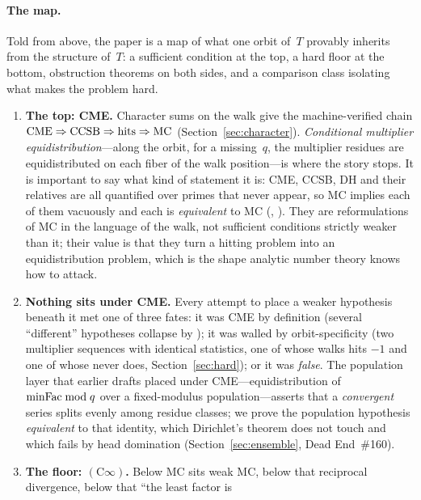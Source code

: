 \paragraph{The map.}
Told from above, the paper is a map of what one orbit of~$T$ provably
inherits from the structure of~$T$: a sufficient condition at the top,
a hard floor at the bottom, obstruction theorems on both sides, and a
comparison class isolating what makes the problem hard.
\begin{enumerate}[nosep,leftmargin=*]
\item \textbf{The top: CME.}  Character sums on the walk give the
  machine-verified chain
  $\mathrm{CME} \Rightarrow \mathrm{CCSB} \Rightarrow \text{hits} \Rightarrow \mathrm{MC}$
  (Section~\ref{sec:character}).  \emph{Conditional multiplier
  equidistribution}---along the orbit, for a missing~$q$, the multiplier
  residues are equidistributed on each fiber of the walk position---is
  where the story stops.  It is important to say what kind of statement
  it is: CME, CCSB, DH and their relatives are all quantified over primes
  that never appear, so MC implies each of them vacuously and each is
  \emph{equivalent} to MC (,
  ).  They are
  reformulations of MC in the language of the walk, not sufficient
  conditions strictly weaker than it; their value is that they turn a
  hitting problem into an equidistribution problem, which is the shape
  analytic number theory knows how to attack.
\item \textbf{Nothing sits under CME.}  Every attempt to place a weaker
  hypothesis beneath it met one of three fates: it was CME by definition
  (several ``different'' hypotheses collapse by ); it was
  walled by orbit-specificity (two multiplier sequences with identical
  statistics, one of whose walks hits $-1$ and one of whose never does,
  Section~\ref{sec:hard}); or it was \emph{false}.  The population layer
  that earlier drafts placed under CME---equidistribution of $\mathrm{minFac}
  \bmod q$ over a fixed-modulus population---asserts that a
  \emph{convergent} series splits evenly among residue classes; we prove
  the population hypothesis \emph{equivalent} to that identity, which
  Dirichlet's theorem does not touch and which fails by head domination
  (Section~\ref{sec:ensemble}, Dead End~\#160).
\item \textbf{The floor: $(\mathrm{C}\infty)$.}  Below MC sits weak MC,
  below that reciprocal divergence, below that ``the least factor is

\end{enumerate}
